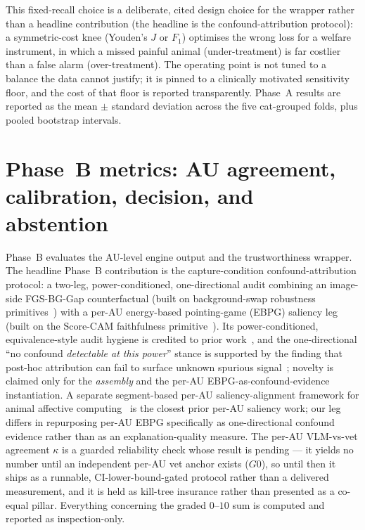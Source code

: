 This fixed-recall choice is a deliberate, cited design choice for the wrapper rather than a
headline contribution (the headline is the confound-attribution protocol): a
symmetric-cost knee (Youden's $J$ or $F_1$) optimises the wrong loss for a welfare instrument,
in which a missed painful animal (under-treatment) is far costlier than a false alarm
(over-treatment). The operating point is not tuned to a balance the data cannot justify; it is
pinned to a clinically motivated sensitivity floor, and the cost of that floor is reported
transparently. Phase~A results are reported as the mean $\pm$ standard deviation across the
five cat-grouped folds, plus pooled bootstrap intervals.

\section{Phase~B metrics: AU agreement, calibration, decision, and abstention}
\label{sec:phaseB-metrics}

Phase~B evaluates the AU-level engine output and the trustworthiness wrapper. The headline
Phase~B contribution is the capture-condition confound-attribution protocol: a two-leg,
power-conditioned, one-directional audit combining an image-side FGS-BG-Gap counterfactual
(built on background-swap robustness primitives~\cite{xiao2021noise,moayeri2022comprehensive})
with a per-AU energy-based pointing-game (EBPG) saliency leg (built on the Score-CAM
faithfulness primitive~\cite{wang2020scorecam}). Its power-conditioned, equivalence-style audit
hygiene is credited to prior work~\autocite{huanghooker2026fairness,singh2023samplesize}, and
the one-directional ``no confound \emph{detectable at this power}'' stance is supported by the
finding that post-hoc attribution can fail to surface unknown spurious signal~\cite{adebayo2022posthoc};
novelty is claimed only for the \emph{assembly} and the per-AU EBPG-as-confound-evidence
instantiation. A separate segment-based per-AU saliency-alignment framework for animal affective
computing~\cite{lencioni2025segment} is the closest prior per-AU saliency work; our leg differs
in repurposing per-AU EBPG specifically as one-directional confound evidence rather than as an
explanation-quality measure. The per-AU VLM-vs-vet
agreement $\kappa$ is a guarded reliability check whose result is pending --- it yields no number
until an independent per-AU vet anchor exists ($G0$), so until then it ships as a runnable,
CI-lower-bound-gated protocol rather than a delivered measurement, and it is held as kill-tree
insurance rather than presented as a co-equal pillar. Everything concerning the graded
$0\text{--}10$ sum is computed and reported as inspection-only.

